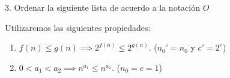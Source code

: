 \begin{ejercicio}{
3. Ordenar la siguiente lista de acuerdo a la notación $O$}

Utilizaremos las siguientes propiedades:
\begin{enumerate}
  \item $f(n) \leq g(n) \implies 2^{f(n)} \leq 2^{g(n)}$.
  ($n_0' = n_0$ y $c'= 2^c$)
  \item $0 < a_1 < a_2 \implies n^{a_1} \leq n^{a_2}$.
  ($n_0 = c = 1$)
\end{enumerate}

\vspace*{10mm}

\end{ejercicio}
